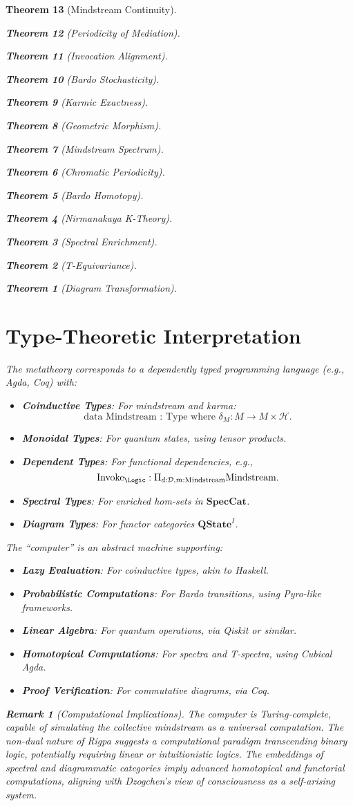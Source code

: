 \documentclass{article}
\newtheorem{theorem}{Theorem}[section]
\newtheorem{remark}{Remark}[section]
\begin{document}
\begin{theorem}[Mindstream Continuity]
\begin{theorem}[Periodicity of Mediation]
\begin{theorem}[Invocation Alignment]
\begin{theorem}[Bardo Stochasticity]
\begin{theorem}[Karmic Exactness]
\begin{theorem}[Geometric Morphism]
\begin{theorem}[Mindstream Spectrum]
\begin{theorem}[Chromatic Periodicity]
\begin{theorem}[Bardo Homotopy]
\begin{theorem}[Nirmanakaya K-Theory]
\begin{theorem}[Spectral Enrichment]
\begin{theorem}[T-Equivariance]
\begin{theorem}[Diagram Transformation]
\section{Type-Theoretic Interpretation}
The metatheory corresponds to a dependently typed programming language (e.g., Agda, Coq) with:
\begin{itemize}
    \item \textbf{Coinductive Types}: For mindstream and karma:
    \[
    \text{data Mindstream : Type where } \delta_M : M \to M \times \mathcal{H}.
    \]
    \item \textbf{Monoidal Types}: For quantum states, using tensor products.
    \item \textbf{Dependent Types}: For functional dependencies, e.g.,
    \[
    \text{Invoke}_\Logic: \Pi_{d : \mathcal{D}, m : \text{Mindstream}} \text{Mindstream}.
    \]
    \item \textbf{Spectral Types}: For enriched hom-sets in \(\mathbf{SpecCat}\).
    \item \textbf{Diagram Types}: For functor categories \(\mathbf{QState}^I\).
\end{itemize}

The “computer” is an abstract machine supporting:
\begin{itemize}
    \item \textbf{Lazy Evaluation}: For coinductive types, akin to Haskell.
    \item \textbf{Probabilistic Computations}: For Bardo transitions, using Pyro-like frameworks.
    \item \textbf{Linear Algebra}: For quantum operations, via Qiskit or similar.
    \item \textbf{Homotopical Computations}: For spectra and T-spectra, using Cubical Agda.
    \item \textbf{Proof Verification}: For commutative diagrams, via Coq.
\end{itemize}

\begin{remark}[Computational Implications]
The computer is Turing-complete, capable of simulating the collective mindstream as a universal computation. The non-dual nature of Rigpa suggests a computational paradigm transcending binary logic, potentially requiring linear or intuitionistic logics. The embeddings of spectral and diagrammatic categories imply advanced homotopical and functorial computations, aligning with Dzogchen’s view of consciousness as a self-arising system.
\end{remark}


\end{theorem}
\end{theorem}
\end{theorem}
\end{theorem}
\end{theorem}
\end{theorem}
\end{theorem}
\end{theorem}
\end{theorem}
\end{theorem}
\end{theorem}
\end{theorem}
\end{theorem}
\end{document}
